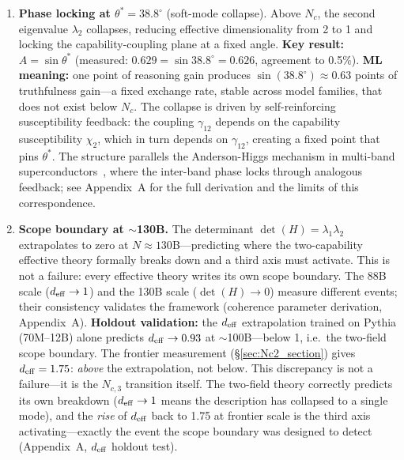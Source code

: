 \documentclass[11pt]{article}
\begin{document}
\begin{enumerate}[leftmargin=*,itemsep=2pt]
\item \textbf{Phase locking at $\theta^* = 38.8^\circ$} (soft-mode collapse).
Above $N_c$, the second eigenvalue $\lambda_2$ collapses, reducing effective dimensionality from 2 to 1 and locking the capability-coupling plane at a fixed angle.
\textbf{Key result:} $A = \sin\theta^*$ (measured: $0.629 = \sin 38.8^\circ = 0.626$, agreement to 0.5\%).
\textbf{ML meaning:} one point of reasoning gain produces $\sin(38.8^\circ) \approx 0.63$ points of truthfulness gain---a fixed exchange rate, stable across model families, that does not exist below $N_c$.
The collapse is driven by self-reinforcing susceptibility feedback: the coupling $\gamma_{12}$ depends on the capability susceptibility $\chi_2$, which in turn depends on $\gamma_{12}$, creating a fixed point that pins $\theta^*$. The structure parallels the Anderson-Higgs mechanism in multi-band superconductors~\cite{amin2020}, where the inter-band phase locks through analogous feedback; see Appendix~A for the full derivation and the limits of this correspondence.

\item \textbf{Scope boundary at $\sim$130B.}
The determinant $\det(H) = \lambda_1\lambda_2$ extrapolates to zero at $N \approx 130$B---predicting where the two-capability effective theory formally breaks down and a third axis must activate.
This is not a failure: every effective theory writes its own scope boundary.
The 88B scale ($d_{\rm eff} \to 1$) and the 130B scale ($\det(H) \to 0$) measure different events; their consistency validates the framework (coherence parameter derivation, Appendix~A).
\textbf{Holdout validation:} the $d_{\rm eff}$ extrapolation trained on Pythia (70M--12B) alone predicts $d_{\rm eff} \to 0.93$ at $\sim$100B---below 1, i.e.\ the two-field scope boundary.
The frontier measurement (\S\ref{sec:Nc2_section}) gives $d_{\rm eff} = 1.75$: \emph{above} the extrapolation, not below.
This discrepancy is not a failure---it is the $N_{c,3}$ transition itself.
The two-field theory correctly predicts its own breakdown ($d_{\rm eff} \to 1$ means the description has collapsed to a single mode), and the \emph{rise} of $d_{\rm eff}$ back to 1.75 at frontier scale is the third axis activating---exactly the event the scope boundary was designed to detect (Appendix~A, $d_{\rm eff}$ holdout test).
\end{enumerate}
\end{document}
